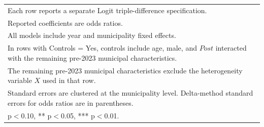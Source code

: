 \begin{table}[!htbp]
\begin{tabular}{llccr}
\multicolumn{5}{l}{\footnotesize Each row reports a separate Logit triple-difference specification.} \\
\multicolumn{5}{l}{\footnotesize Reported coefficients are odds ratios.} \\
\multicolumn{5}{l}{\footnotesize All models include year and municipality fixed effects.} \\
\multicolumn{5}{l}{\footnotesize In rows with Controls = Yes, controls include age, male, and $Post$ interacted with the remaining pre-2023 municipal characteristics.} \\
\multicolumn{5}{l}{\footnotesize The remaining pre-2023 municipal characteristics exclude the heterogeneity variable $X$ used in that row.} \\
\multicolumn{5}{l}{\footnotesize Standard errors are clustered at the municipality level. Delta-method standard errors for odds ratios are in parentheses.} \\
\multicolumn{5}{l}{\footnotesize * p$<$0.10, ** p$<$0.05, *** p$<$0.01.} \\
\end{tabular}
\end{table}

